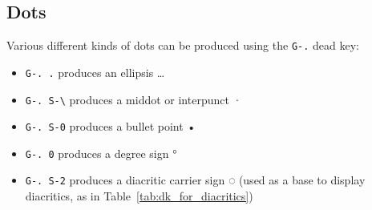 \documentclass[oneside]{memoir}
\newcommand{\key}{\verb}
\newcommand{\out}[1]{\colorbox{gray!20}{#1}}
\begin{document}
\subsection{Dots}
\label{sec:dots}

Various different kinds of dots can be produced using the \key|G-.| dead key:

\begin{itemize}[noitemsep]
\item \key|G-. .| produces an ellipsis \out{…}
\item \key|G-. S-\| produces a middot or interpunct \out{·}
\item \key|G-. S-0| produces a bullet point \out{•}
\item \key|G-. 0| produces a degree sign \out{°}
\item \key|G-. S-2| produces a diacritic carrier sign \out{◌}
  (used as a base to display diacritics, as in Table~\ref{tab:dk_for_diacritics})
\end{itemize}
\end{document}
